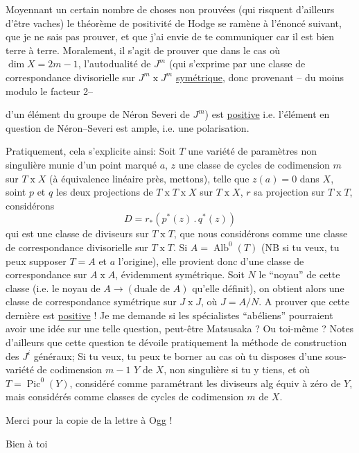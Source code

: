 
Moyennant un certain nombre de choses non prouvées (qui risquent d'ailleurs d'être vaches) le théorème de positivité de Hodge se ramène à l'énoncé suivant, que je ne sais pas prouver, et que j'ai envie de te communiquer car il est bien terre à terre. Moralement, il s'agit de prouver que dans le cas où $\dim X=2m-1$, l'autodualité de $J^m$ (qui s'exprime par une classe de correspondance divisorielle sur $J^m\mathbin{x}J^m$  \uline{symétrique}, donc provenant -- du moins modulo le facteur 2--





d'un élément du groupe de Néron Severi de $J^m$) est \uline{positive} i.e. l'élément en question de Néron--Severi est ample, i.e. une polarisation.

Pratiquement, cela s'explicite ainsi: Soit $T$ une variété de paramètres  non singulière munie d'un point marqué $a$, $z$ une classe de cycles de codimension $m$ sur $T\mathbin{x}X$ (à équivalence linéaire près, mettons), telle que $z(a)=0$ dans $X$, soint $p$ et $q$ les deux projections de $T\mathbin{x}T\mathbin{x}X$ sur $T\mathbin{x}X$, $r$ sa projection sur $T\mathbin{x}T$, considérons
\[
D=r_*(p^*(z)\mathbin{.}q^*(z))
\]
qui est une classe de diviseurs sur $T\mathbin{x}T$, que nous considérons comme une classe de correspondance divisorielle sur $T\mathbin{x}T$. Si $A=\operatorname{Alb}^0(T)$ (NB si tu veux, tu peux supposer $T=A$ et $a$ l'origine), elle provient donc d'une classe de correspondance sur $A\mathbin{x}A$, évidemment symétrique. Soit $N$ le ``noyau'' de cette classe (i.e. le noyau de $A\longrightarrow(\text{duale de }A)$ qu'elle définit), on obtient alors une classe de correspondance symétrique sur $J\mathbin{x}J$, où $J=A/N$. A prouver que cette dernière est \uline{positive} ! Je me demande si les spécialistes ``abéliens'' pourraient avoir une idée sur une telle question, peut-être Matsusaka ? Ou toi-même ? Notes d'ailleurs que cette question te dévoile pratiquement la méthode de construction des $J^i$ généraux; Si tu veux, tu peux te borner  au cas où tu disposes d'une sous-variété de codimension $m-1$ $Y$ de $X$, non singulière si tu y tiens,  et où $T=\operatorname{Pic}^0(Y)$, considéré comme paramétrant les diviseurs alg équiv à zéro de $Y$, mais considérés comme classes de cycles  de codimension $m$ de $X$.

Merci pour la copie de la lettre à Ogg !

Bien à toi


